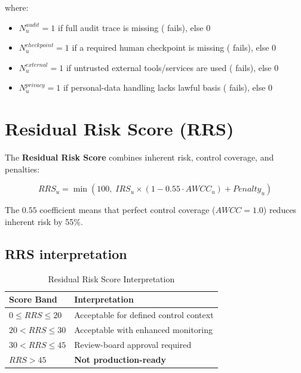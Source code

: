 where:
\begin{itemize}
  \item $N^{audit}_u = 1$ if full audit trace is missing ( fails), else $0$
  \item $N^{checkpoint}_u = 1$ if a required human checkpoint is missing
        ( fails), else $0$
  \item $N^{external}_u = 1$ if untrusted external tools/services are used
        ( fails), else $0$
  \item $N^{privacy}_u = 1$ if personal-data handling lacks lawful basis
        ( fails), else $0$
\end{itemize}

\section{Residual Risk Score (RRS)}

The \textbf{Residual Risk Score} combines inherent risk, control coverage, and
penalties:

\begin{equation}
\boxed{
RRS_u = \min\left(100, \; IRS_u \times (1 - 0.55 \cdot AWCC_u) + Penalty_u\right)
}
\label{eq:rrs}
\end{equation}

The $0.55$ coefficient means that perfect control coverage ($AWCC = 1.0$)
reduces inherent risk by 55\%.

\subsection{RRS interpretation}

\begin{table}[htbp]
\centering
\caption{Residual Risk Score Interpretation}
\label{tab:rrs-interpretation}
\begin{tabular}{l l}
\toprule
\textbf{Score Band} & \textbf{Interpretation} \\
\midrule
$0 \leq RRS \leq 20$ & Acceptable for defined control context \\
$20 < RRS \leq 30$ & Acceptable with enhanced monitoring \\
$30 < RRS \leq 45$ & Review-board approval required \\
$RRS > 45$ & \textbf{Not production-ready} \\
\bottomrule
\end{tabular}
\end{table}

